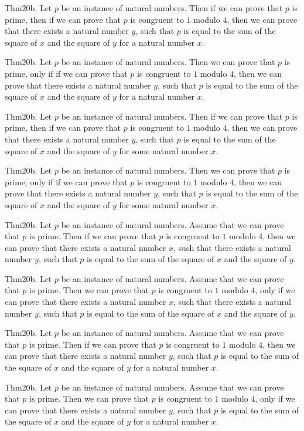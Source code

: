 \documentclass{article}
\begin{document}
Thm20b. Let $p$ be an instance of natural numbers. Then if we can prove that $p$ is prime, then if we can prove that $p$ is congruent to $1$ modulo $4$, then we can prove that there exists a natural number $y$, such that $p$ is equal to the sum of the square of $x$ and the square of $y$ for a natural number $x$.

Thm20b. Let $p$ be an instance of natural numbers. Then we can prove that $p$ is prime, only if if we can prove that $p$ is congruent to $1$ modulo $4$, then we can prove that there exists a natural number $y$, such that $p$ is equal to the sum of the square of $x$ and the square of $y$ for a natural number $x$.

Thm20b. Let $p$ be an instance of natural numbers. Then if we can prove that $p$ is prime, then if we can prove that $p$ is congruent to $1$ modulo $4$, then we can prove that there exists a natural number $y$, such that $p$ is equal to the sum of the square of $x$ and the square of $y$ for some natural number $x$.

Thm20b. Let $p$ be an instance of natural numbers. Then we can prove that $p$ is prime, only if if we can prove that $p$ is congruent to $1$ modulo $4$, then we can prove that there exists a natural number $y$, such that $p$ is equal to the sum of the square of $x$ and the square of $y$ for some natural number $x$.

Thm20b. Let $p$ be an instance of natural numbers. Assume that we can prove that $p$ is prime. Then if we can prove that $p$ is congruent to $1$ modulo $4$, then we can prove that there exists a natural number $x$, such that there exists a natural number $y$, such that $p$ is equal to the sum of the square of $x$ and the square of $y$.

Thm20b. Let $p$ be an instance of natural numbers. Assume that we can prove that $p$ is prime. Then we can prove that $p$ is congruent to $1$ modulo $4$, only if we can prove that there exists a natural number $x$, such that there exists a natural number $y$, such that $p$ is equal to the sum of the square of $x$ and the square of $y$.

Thm20b. Let $p$ be an instance of natural numbers. Assume that we can prove that $p$ is prime. Then if we can prove that $p$ is congruent to $1$ modulo $4$, then we can prove that there exists a natural number $y$, such that $p$ is equal to the sum of the square of $x$ and the square of $y$ for a natural number $x$.

Thm20b. Let $p$ be an instance of natural numbers. Assume that we can prove that $p$ is prime. Then we can prove that $p$ is congruent to $1$ modulo $4$, only if we can prove that there exists a natural number $y$, such that $p$ is equal to the sum of the square of $x$ and the square of $y$ for a natural number $x$.
\end{document}
